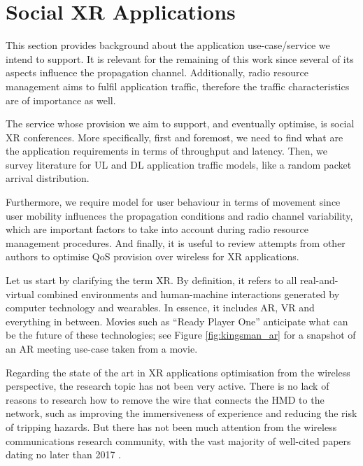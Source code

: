 \section{Social XR Applications}
\label{sec:sxr_applications}


This section provides background about the application use-case/service we intend to support. It is relevant for the remaining of this work since several of its aspects influence the propagation channel. Additionally, radio resource management aims to fulfil application traffic, therefore the traffic characteristics are of importance as well.

The service whose provision we aim to support, and eventually optimise, is social XR conferences. More specifically, first and foremost, we need to find what are the application requirements in terms of throughput and latency. Then, we survey literature for \ac{UL} and \ac{DL} application traffic models, like a random packet arrival distribution.

Furthermore, we require model for user behaviour in terms of movement since user mobility influences the propagation conditions and radio channel variability, which are important factors to take into account during radio resource management procedures. And finally, it is useful to review attempts from other authors to optimise \ac{QoS} provision over wireless for XR applications.

Let us start by clarifying the term \ac{XR}. By definition, it refers to all real-and-virtual combined environments and human-machine interactions generated by computer technology and wearables. In essence, it includes \ac{AR}, \ac{VR} and everything in between. Movies such as ``Ready Player One'' \cite{readyPlayerOne} anticipate what can be the future of these technologies; see Figure \ref{fig:kingsman_ar} for a snapshot of an AR meeting use-case taken from a movie.



Regarding the state of the art in XR applications optimisation from the wireless perspective, the research topic has not been very active. There is no lack of reasons to research how to remove the wire that connects the \ac{HMD} to the network, such as improving the immersiveness of experience and reducing the risk of tripping hazards. But there has not been much attention from the wireless communications research community, with the vast majority of well-cited papers dating no later than 2017 \cite{9112752}.

